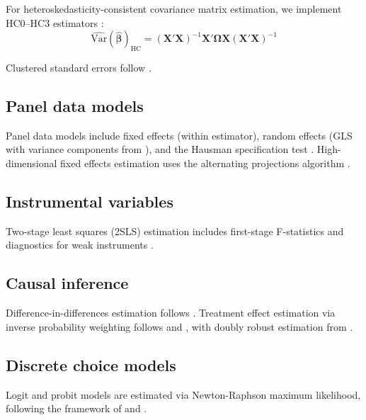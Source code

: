 For heteroskedasticity-consistent covariance matrix estimation, we implement
HC0--HC3 estimators \citep{White:1980, MacKinnon+White:1985, Zeileis:2004}:
\begin{equation}
  \widehat{\mathrm{Var}}(\hat{\bm{\beta}})_{\mathrm{HC}} =
    (\mathbf{X}'\mathbf{X})^{-1} \mathbf{X}'\bm{\Omega}\mathbf{X} (\mathbf{X}'\mathbf{X})^{-1}
\end{equation}

Clustered standard errors follow \cite{Cameron+Gelbach+Miller:2011}.

\subsection{Panel data models} \label{sec:panel}

Panel data models include fixed effects (within estimator), random effects
(GLS with variance components from \cite{Swamy+Arora:1972}), and the Hausman
specification test \citep{Hausman:1978}. High-dimensional fixed effects
estimation uses the alternating projections algorithm \citep{Guimaraes+Portugal:2010,
Gaure:2013, Correia:2017}.

\subsection{Instrumental variables} \label{sec:iv}

Two-stage least squares (2SLS) estimation includes first-stage F-statistics
and diagnostics for weak instruments \citep{Staiger+Stock:1997, Stock+Yogo:2005}.

\subsection{Causal inference} \label{sec:causal}

Difference-in-differences estimation follows \cite{Card+Krueger:1994}.
Treatment effect estimation via inverse probability weighting follows
\cite{Horvitz+Thompson:1952} and \cite{Robins+Rotnitzky+Zhao:1994}, with
doubly robust estimation from \cite{Bang+Robins:2005}.

\subsection{Discrete choice models} \label{sec:discrete}

Logit and probit models are estimated via Newton-Raphson maximum likelihood,
following the framework of \cite{McFadden:1974} and \cite{Train:2009}.

